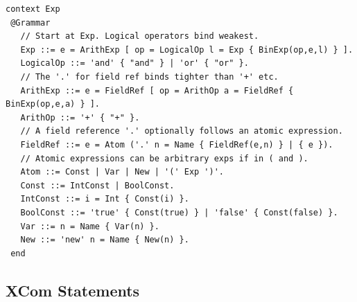 \documentclass{article}
\begin{document}
\begin{verbatim}
context Exp
 @Grammar    
   // Start at Exp. Logical operators bind weakest.
   Exp ::= e = ArithExp [ op = LogicalOp l = Exp { BinExp(op,e,l) } ].
   LogicalOp ::= 'and' { "and" } | 'or' { "or" }.
   // The '.' for field ref binds tighter than '+' etc.
   ArithExp ::= e = FieldRef [ op = ArithOp a = FieldRef { BinExp(op,e,a) } ].
   ArithOp ::= '+' { "+" }.
   // A field reference '.' optionally follows an atomic expression.
   FieldRef ::= e = Atom ('.' n = Name { FieldRef(e,n) } | { e }).
   // Atomic expressions can be arbitrary exps if in ( and ).
   Atom ::= Const | Var | New | '(' Exp ')'.
   Const ::= IntConst | BoolConst.
   IntConst ::= i = Int { Const(i) }.
   BoolConst ::= 'true' { Const(true) } | 'false' { Const(false) }.
   Var ::= n = Name { Var(n) }.
   New ::= 'new' n = Name { New(n) }.
 end
\end{verbatim}

\subsection{XCom Statements}
\end{document}
